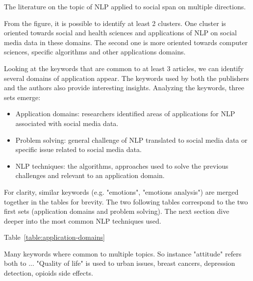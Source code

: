The literature on the topic of NLP applied to social span on multiple directions.

From the figure, it is possible to identify at least 2 clusters.
One cluster is oriented towards social and health sciences and applications of NLP on social media data in these domains.
The second one is more oriented towards computer sciences, specific algorithms and other applications domains.

Looking at the keywords that are common to at least 3 articles, we can identify several domains of application appear.
The keywords used by both the publishers and the authors also provide interesting insights.
Analyzing the keywords, three sets emerge:
\begin{itemize}
    \item Application domains: researchers identified areas of applications for NLP associated with social media data.
    \item Problem solving: general challenge of NLP translated to social media data or specific issue related to social media data.
    \item NLP techniques: the algorithms, approaches used to solve the previous challenges and relevant to an application domain.
\end{itemize}
For clarity, similar keywords (e.g. "emotions", "emotions analysis") are merged together in the tables for brevity.
The two following tables correspond to the two first sets (application domains and problem solving).
The next section dive deeper into the most common NLP techniques used.

Table~\ref{table:application-domains}

Many keywords where common to multiple topics. So instance "attitude" refers both to ...
"Quality of life" is used to urban issues, breast cancers, depression detection, opioids side effects.


